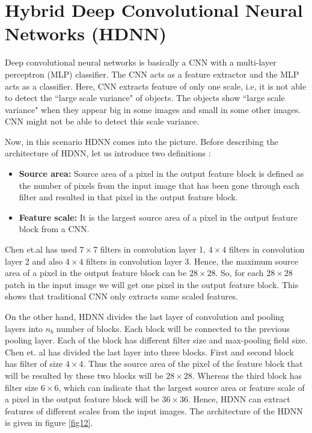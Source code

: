 \section{Hybrid Deep Convolutional Neural Networks (HDNN)}
Deep convolutional neural networks is basically a CNN with a multi-layer perceptron (MLP) classifier. The CNN acts as a feature extractor and the MLP acts as a classifier. Here, CNN extracts feature of only one scale, i.e, it is not able to detect the ``large scale variance" \cite{b8} of objects. The objects show ``large scale variance" when they appear big in some images and small in some other images. CNN might not be able to detect this scale variance. 
\par Now, in this scenario HDNN \cite{b8} comes into the picture. Before describing the architecture of HDNN, let us introduce two definitions : 
\begin{itemize}
    \item \textbf{Source area: } Source area of a pixel in the output feature block is defined as the number of pixels from the input image that has been gone through each filter and resulted in that pixel in the output feature block. 
    \item \textbf{Feature scale: }It is the largest source area of a pixel in the output feature block from a CNN. 
\end{itemize}
\par Chen et.al \cite{b8} has used $7\times 7$ filters in convolution layer 1, $4\times 4$ filters in convolution layer 2 and also $4\times 4$ filters in convolution layer 3. Hence, the maximum source area of a pixel in the output feature block can be $28\times 28$. So, for each $28\times 28$ patch in the input image we will get one pixel in the output feature block. This shows that traditional CNN only extracts same scaled features. 
\par On the other hand, HDNN divides the last layer of convolution and pooling layers into $n_b$ number of blocks. Each block will be connected to the previous pooling layer. Each of the block has different filter size and max-pooling field size. Chen et. al \cite{b8} has divided the last layer into three blocks. First and second block has filter of size $4\times 4$. Thus the source area of the pixel of the feature block that will be resulted by these two blocks will be $28\times 28$. Whereas the third block has filter size $6\times 6$, which can indicate that the largest source area or feature scale of a pixel in the output feature block will be $36\times 36$. Hence, HDNN can extract features of different scales from the input images. The architecture of the HDNN is given in figure \ref{fig12}.

